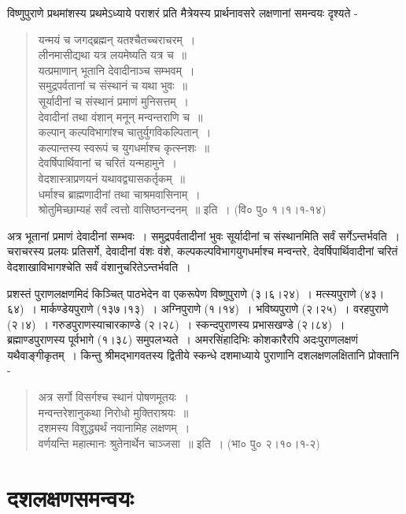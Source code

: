 {विष्णुपुराणे प्रथमांशस्य प्रथमेऽध्याये पराशरं प्रति मैत्रेयस्य प्रार्थनावसरे लक्षणानां समन्वयः दृश्यते -
\begin{verse}
यन्मयं च जगद्ब्रह्मन् यतश्चैतच्चराचरम्~।\\
लीनमासीद्यथा यत्र लयमेष्यति यत्र च~॥\\
यत्प्रमाणान् भूतानि देवादीनाञ्च सम्भवम्~।\\
समुद्रपर्वतानां च संस्थानं च यथा भुवः~॥\\
सूर्यादीनां च संस्थानं प्रमाणं मुनिसत्तम्~।\\
देवादीनां तथा वंशान् मनून् मन्वन्तराणि च~॥\\
कल्पान् कल्पविभागांश्च चातुर्युगविकल्पितान्~।\\
कल्पान्तस्य स्वरूपं च युगधर्माश्च कृत्स्नशः~॥\\
देवर्षिपार्थिवानां च चरितं यन्महामुने~।\\
वेदशास्त्राप्रणयनं यथावद्व्यासकर्तृकम्~॥\\
धर्माश्च ब्राह्मणादीनां तथा चाश्रमवासिनाम्~।\\
श्रोतुमिच्छाम्यहं सर्वं त्वत्तो वासिष्ठनन्दनम्~॥ इति~। (वि० पु० १।१।१-१४)
\end{verse}
अत्र भूतानां प्रमाणं देवादीनां सम्भवः~। समुद्रपर्वतादीनां भुवः सूर्यादीनां च संस्थानमिति सर्वं सर्गेऽन्तर्भवति~। चराचरस्य प्रलयः प्रतिसर्गे, देवादीनां वंशः वंशे, कल्पकल्पविभागयुगधर्माश्च मन्वन्तरे, देवर्षिपार्थिवादीनां चरितं वेदशाखाविभागश्चेति सर्वं वंशानुचरितेऽन्तर्भवति~।

प्रशस्तं पुराणलक्षणमिदं किञ्चित् पाठभेदेन वा एकरूपेण विष्णुपुराणे (३।६।२४)~। मत्स्यपुराणे (४३।६४)~। मार्कण्डेयपुराणे (१३७।१३)~। अग्निपुराणे (१।१४)~। भविष्यपुराणे (२।२५)~। वरहपुराणे (२।४)~। गरुडपुराणस्याचारकाण्डे (२।२८)~। स्कन्दपुराणस्य प्रभासखण्डे (२।८४)~। ब्रह्माण्डपुराणस्य पूर्वभागे (१।३८) समुपलभ्यते~। अमरसिंहादिभिः कोशकारैरपि अदःपुराणलक्षणं यथैवाङ्गीकृतम्~। किन्तु श्रीमद्भागवतस्य द्वितीये स्कन्धे दशमाध्याये पुराणानि दशलक्षणलक्षितानि प्रोक्तानि -
\begin{verse}
अत्र सर्गो विसर्गश्च स्थानं पोषणमूतयः~।\\
मन्वन्तरेशानुकथा निरोधो मुक्तिराश्रयः~॥\\
दशमस्य विशुद्ध्यर्थं नवानामिह लक्षणम्~।\\
वर्णयन्ति महात्मानः श्रुतेनार्थेन चाञ्जसा~॥ इति~। (भा० पु० २।१०।१-२)
\end{verse}

\section*{दशलक्षणसमन्वयः}

}
